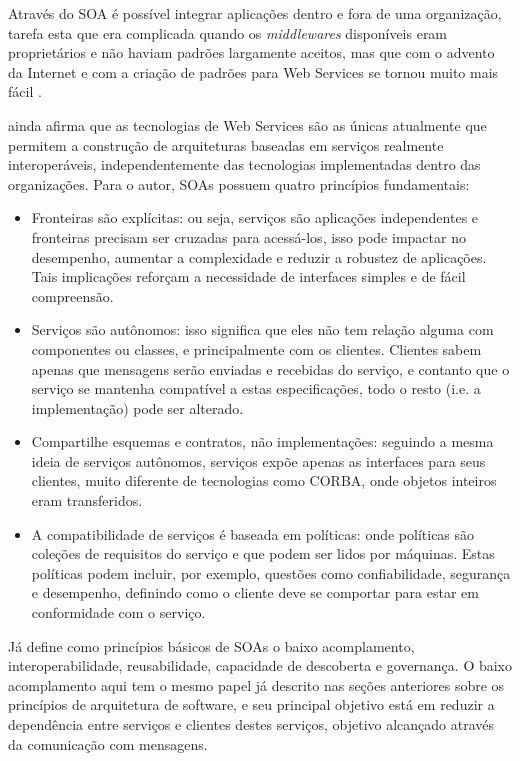 \documentclass[diss]{template/setrem}
\begin{document}
Através do SOA é possível integrar aplicações dentro e fora de uma organização, tarefa esta que era complicada quando os \emph{middlewares} disponíveis eram proprietários e não haviam padrões largamente aceitos, mas que com o advento da Internet e com a criação de padrões para Web Services se tornou muito mais fácil \citep{Gorton2011}.

\citet{Gorton2011} ainda afirma que as tecnologias de Web Services são as únicas atualmente que permitem a construção de arquiteturas baseadas em serviços realmente interoperáveis, independentemente das tecnologias implementadas dentro das organizações. Para o autor, SOAs possuem quatro princípios fundamentais:
\begin{itemize}
	\item Fronteiras são explícitas: ou seja, serviços são aplicações independentes e fronteiras precisam ser cruzadas para acessá-los, isso pode impactar no desempenho, aumentar a complexidade e reduzir a robustez de aplicações. Tais implicações reforçam a necessidade de interfaces simples e de fácil compreensão.
	\item Serviços são autônomos: isso significa que eles não tem relação alguma com componentes ou classes, e principalmente com os clientes. Clientes sabem apenas que mensagens serão enviadas e recebidas do serviço, e contanto que o serviço se mantenha compatível a estas especificações, todo o resto (i.e. a implementação) pode ser alterado.
	\item Compartilhe esquemas e contratos, não implementações: seguindo a mesma ideia de serviços autônomos, serviços expõe apenas as interfaces para seus clientes, muito diferente de tecnologias como CORBA, onde objetos inteiros eram transferidos.
	\item A compatibilidade de serviços é baseada em políticas: onde políticas são coleções de requisitos do serviço e que podem ser lidos por máquinas. Estas políticas podem incluir, por exemplo, questões como confiabilidade, segurança e desempenho, definindo como o cliente deve se comportar para estar em conformidade com o serviço.
\end{itemize}

Já \citet{Bean2010} define como princípios básicos de SOAs o baixo acomplamento, interoperabilidade, reusabilidade, capacidade de descoberta e governança. O baixo acomplamento aqui tem o mesmo papel já descrito nas seções anteriores sobre os princípios de arquitetura de software, e seu principal objetivo está em reduzir a dependência entre serviços e clientes destes serviços, objetivo alcançado através da comunicação com mensagens. 
\end{document}
